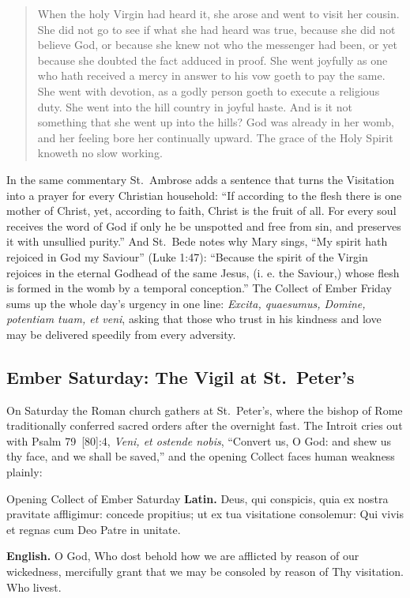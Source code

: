 \begin{quote}
When the holy Virgin had heard it, she arose and went to visit her cousin. She
did not go to see if what she had heard was true, because she did not believe
God, or because she knew not who the messenger had been, or yet because she
doubted the fact adduced in proof. She went joyfully as one who hath received a
mercy in answer to his vow goeth to pay the same. She went with devotion, as a
godly person goeth to execute a religious duty. She went into the hill country
in joyful haste. And is it not something that she went up into the hills? God
was already in her womb, and her feeling bore her continually upward. The grace
of the Holy Spirit knoweth no slow working.
\end{quote}

In the same commentary St.~Ambrose adds a sentence that turns the Visitation
into a prayer for every Christian household: ``If according to the flesh there
is one mother of Christ, yet, according to faith, Christ is the fruit of all.
For every soul receives the word of God if only he be unspotted and free from
sin, and preserves it with unsullied purity.'' And St.~Bede notes why Mary
sings, ``My spirit hath rejoiced in God my Saviour'' (Luke 1:47): ``Because the
spirit of the Virgin rejoices in the eternal Godhead of the same Jesus, (i. e.
the Saviour,) whose flesh is formed in the womb by a temporal conception.''
The Collect of Ember Friday sums up the whole day's urgency in one line:
\textit{Excita, quaesumus, Domine, potentiam tuam, et veni}, asking that those
who trust in his kindness and love may be delivered speedily from every
adversity.

\subsection{Ember Saturday: The Vigil at St.~Peter's}

On Saturday the Roman church gathers at St.~Peter's, where the bishop of Rome
traditionally conferred sacred orders after the overnight fast. The Introit
cries out with Psalm 79~[80]:4, \textit{Veni, et ostende nobis}, ``Convert us,
O God: and shew us thy face, and we shall be saved,'' and the opening Collect
faces human weakness plainly:

\begin{massbox}{Opening Collect of Ember Saturday}
\textbf{Latin.} Deus, qui conspicis, quia ex nostra pravitate affligimur:
concede propitius; ut ex tua visitatione consolemur: Qui vivis et regnas cum
Deo Patre in unitate.

\textbf{English.} O God, Who dost behold how we are afflicted by reason of our
wickedness, mercifully grant that we may be consoled by reason of Thy
visitation. Who livest.
\end{massbox}

